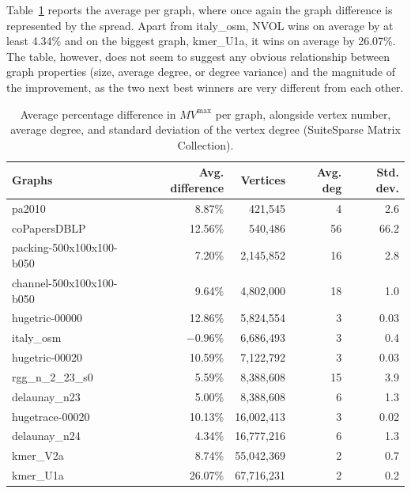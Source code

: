 Table~\ref{tab:suitesparse_METISvsNVOL_avgs} reports the average per graph, where once again the graph difference is represented by the spread. Apart from italy\_osm, NVOL wins on average by at least 4.34\% and on the biggest graph, kmer\_U1a, it wins on average by 26.07\%. The table, however, does not seem to suggest any obvious relationship between graph properties (size, average degree, or degree variance) and the magnitude of the improvement, as the two next best winners are very different from each other. 
\begin{table}[h]
	\centering
	\begin{tabular}{|l|r|r|r|r|}
		\hline
		\textbf{Graphs} & \textbf{Avg. difference} & \textbf{Vertices} & \textbf{Avg. deg} & \textbf{Std. dev.}\\
		\hline
		pa2010 & 8.87\% & 421,545 & 4 & 2.6\\ %
		\hline
		coPapersDBLP & 12.56\% & 540,486 & 56 & 66.2\\ %
		\hline
		packing-500x100x100-b050 & 7.20\% & 2,145,852 & 16 & 2.8\\ %
		\hline
		channel-500x100x100-b050 & 9.64\% & 4,802,000 & 18 & 1.0\\ %
		\hline
		hugetric-00000 & 12.86\% & 5,824,554 & 3 & 0.03\\ %
		\hline
		italy\_osm & $-0.96$\% & 6,686,493 & 3 & 0.4\\ %
		\hline
		hugetric-00020 & 10.59\% & 7,122,792 & 3 & 0.03\\ %
		\hline
		rgg\_n\_2\_23\_s0 & 5.59\% & 8,388,608 & 15 & 3.9\\ %
		\hline
		delaunay\_n23 & 5.00\% & 8,388,608 & 6 & 1.3\\ %
		\hline
		hugetrace-00020 & 10.13\% & 16,002,413 & 3 & 0.02\\ %
		\hline
		delaunay\_n24 & 4.34\% & 16,777,216 & 6 & 1.3\\ %
		\hline
		kmer\_V2a & 8.74\% & 55,042,369 & 2 & 0.7\\ %
		\hline
		kmer\_U1a & 26.07\% & 67,716,231 & 2 & 0.2\\ %
		\hline
	\end{tabular}
	\caption{Average percentage difference in $MV^{\mathrm{max}}$ per graph, alongside vertex number, average degree, and standard deviation of the vertex degree (SuiteSparse Matrix Collection).}	
	\label{tab:suitesparse_METISvsNVOL_avgs}
\end{table}

